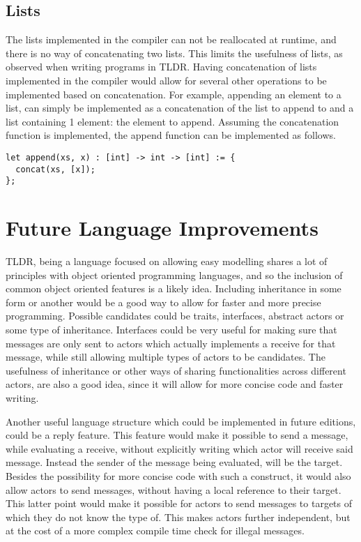 \subsection{Lists}

The lists implemented in the compiler can not be reallocated at runtime, and there is no way of concatenating two lists. This limits the usefulness of lists, as observed when writing programs in TLDR. Having concatenation of lists implemented in the compiler would allow for several other operations to be implemented based on concatenation. For example, appending an element to a list, can simply be implemented as a concatenation of the list to append to and a list containing 1 element: the element to append. Assuming the concatenation function is implemented, the append function can be implemented as follows.

\begin{lstlisting}[caption = {Implementation of the append function based on the concatenation function.}]
let append(xs, x) : [int] -> int -> [int] := {
  concat(xs, [x]);
};
\end{lstlisting}

\section{Future Language Improvements}

TLDR, being a language focused on allowing easy modelling shares a lot of principles with object oriented programming languages, and so the inclusion of common object oriented features is a likely idea. Including inheritance in some form or another would be a good way to allow for faster and more precise programming. Possible candidates could be traits, interfaces, abstract actors or some type of inheritance. Interfaces could be very useful for making sure that messages are only sent to actors which actually implements a receive for that message, while still allowing multiple types of actors to be candidates. The usefulness of inheritance or other ways of sharing functionalities across different actors, are also a good idea, since it will allow for more concise code and faster writing.

Another useful language structure which could be implemented in future editions, could be a reply feature. This feature would make it possible to send a message, while evaluating a receive, without explicitly writing which actor will receive said message. Instead the sender of the message being evaluated, will be the target. Besides the possibility for more concise code with such a construct, it would also allow actors to send messages, without having a local reference to their target. This latter point would make it possible for actors to send messages to targets of which they do not know the type of. This makes actors further independent, but at the cost of a more complex compile time check for illegal messages.


